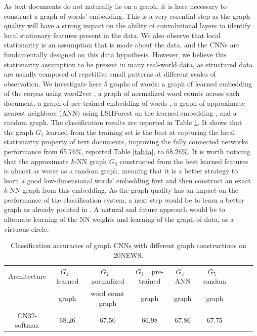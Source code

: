 \documentclass{article}
\begin{document}
\noindent
As text documents do not naturally lie on a graph, it is here necessary to construct a graph of words' embedding. This is a very essential step as the graph quality will have a strong impact on the ability of convolutional layers to identify local stationary features present in the data. We also observe that local stationarity is an assumption that is made about the data, and the CNNs are fundamentally designed on this data hypothesis. However, we believe this stationarity assumption to be present in many real-world data, as structured data are usually composed of repetitive small patterns at different scales of observation. We investigate here 5 graphs of words: a graph of learned embedding of the corpus using word2vec \cite{pro:MikolovChenCorradoDean13word2vec}, a graph of normalized word counts across each document,
a graph of pre-trained embedding of words \cite{pro:MikolovChenCorradoDean13word2vec}, a graph of approximate nearest neighbors (ANN) using LSHForest \cite{pro:BawaCondieGanesan05LSHForest} on the learned embedding \cite{pro:MikolovChenCorradoDean13word2vec}, and a random graph. The classification results are reported in Table \ref{tab4b}. It shows that the graph $G_1$ learned from the training set is the best at capturing the local stationarity property of text documents, improving the fully connected networks performance from 65.76\%, reported Table \ref{tab4a}, to 68.26\%. It is worth noticing that the approximate $k$-NN graph $G_4$ constructed from the best learned features is almost as worse as a random graph, meaning that it is a better strategy to learn a good low-dimensional words' embedding first and then construct an exact $k$-NN graph from this embedding. As the graph quality has an impact on the performance of the classification system, a next step would be to learn a better graph as already pointed in \cite{art:HenaffBrunaLeCun15DLgraphs}. A natural and future approach would be to alternate learning of the NN weights and learning of the graph of data, as a virtuous circle. 




\begin{table}[h!]
 \centering
{\small
\begin{tabular}{|c|c|c|c|c|c|c|c|c|}
\hline
 Architecture & $G_1$= learned  & $G_2$= normalized  & $G_3$= pre-trained & $G_4$= ANN  &  $G_5$= random   \\
  & graph \cite{pro:MikolovChenCorradoDean13word2vec} & word count graph & graph  &  graph  & graph \\
\hline
CN32-softmax & 68.26 & 67.50 & 66.98 & 67.86 & 67.75  \\
\hline
\end{tabular}
}
\caption{Classification accuracies of graph CNNs with different graph constructions on 20NEWS.} 
\label{tab4b}
\end{table}
\end{document}
